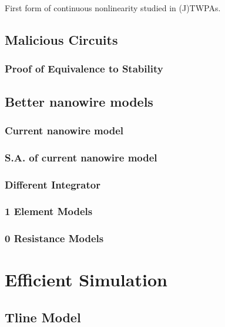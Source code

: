 \documentclass{article}
\begin{document}
First form of continuous nonlinearity studied in (J)TWPAs.

\subsection{Malicious Circuits}


\subsubsection{Proof of Equivalence to Stability}

\subsection{Better nanowire models}

\subsubsection{Current nanowire model}


\subsubsection{S.A. of current nanowire model}

\subsubsection{Different Integrator}

\subsubsection{1 Element Models}

\subsubsection{0 Resistance Models}

\section{Efficient Simulation}


\subsection{Tline Model}
\end{document}
